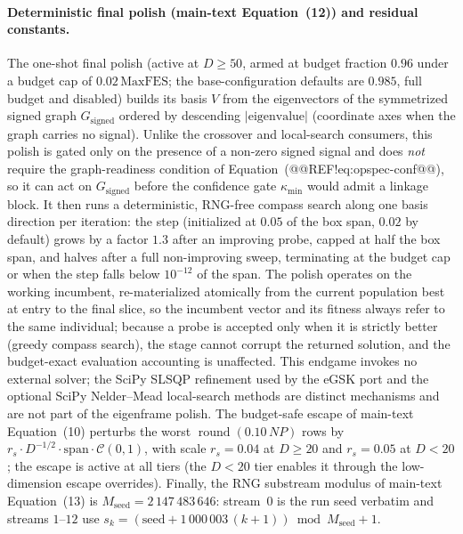 \documentclass[10pt,a4paper]{article}
\newcommand{\egsk}{eGSK}
\begin{document}
\paragraph{Deterministic final polish (main-text Equation~(12)) and residual constants.}
The one-shot final polish (active at $D\ge 50$, armed at budget fraction $0.96$
under a budget cap of $0.02\,\mathrm{MaxFES}$; the base-configuration defaults
are $0.985$, full budget and disabled) builds its basis $V$ from the
eigenvectors of the symmetrized signed graph $G_{\mathrm{signed}}$ ordered by
descending $\lvert\text{eigenvalue}\rvert$ (coordinate axes when the graph
carries no signal).  Unlike the crossover and local-search consumers, this polish
is gated only on the presence of a non-zero signed signal and does \emph{not}
require the graph-readiness condition of Equation~(@@REF!eq:opspec-conf@@), so it can
act on $G_{\mathrm{signed}}$ before the confidence gate $\kappa_{\min}$ would admit
a linkage block.  It then runs a deterministic, RNG-free compass search along one
basis direction per iteration: the step (initialized at $0.05$ of the box span,
$0.02$ by default) grows by a factor $1.3$ after an improving probe, capped at
half the box span, and halves after a full non-improving sweep, terminating at
the budget cap or when the step falls below $10^{-12}$ of the span.  The polish
operates on the working incumbent, re-materialized atomically from the current
population best at entry to the final slice, so the incumbent vector and its fitness
always refer to the same individual; because a probe is accepted only
when it is strictly better (greedy compass search), the stage cannot corrupt
the returned solution, and the
budget-exact evaluation accounting is unaffected.  This endgame
invokes no external solver; the SciPy SLSQP refinement used by the \egsk{} port
and the optional SciPy Nelder--Mead local-search methods are distinct mechanisms
and are not part of the eigenframe polish.  The budget-safe escape of
main-text Equation~(10) perturbs the worst $\operatorname{round}(0.10\,NP)$ rows by
$r_{s}\cdot D^{-1/2}\cdot\mathrm{span}\cdot\mathcal{C}(0,1)$, with scale
$r_{s}=0.04$ at $D\ge 20$ and $r_{s}=0.05$ at $D<20$; the escape is active at all
tiers (the $D<20$ tier enables it through the low-dimension escape
overrides).  Finally, the RNG substream
modulus of main-text Equation~(13) is $M_{\mathrm{seed}} = 2\,147\,483\,646$: stream~$0$ is the run seed
verbatim and streams $1$--$12$ use $s_k=(\text{seed}+1\,000\,003\,(k{+}1))\bmod
M_{\mathrm{seed}} + 1$.
\end{document}
